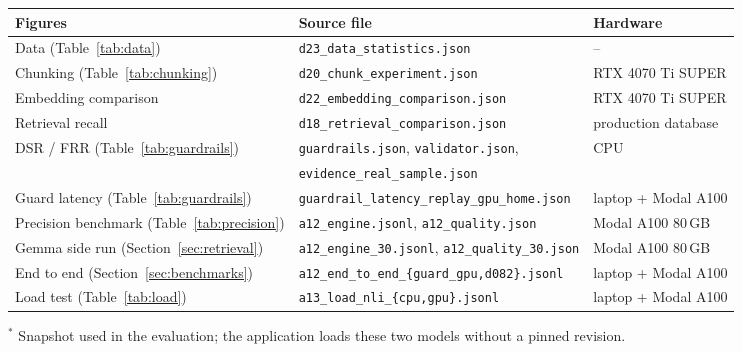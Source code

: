 \begin{table}[ht]
\medskip
\begin{tabular}{lll}
\toprule
Figures & Source file & Hardware \\
\midrule
Data (Table~\ref{tab:data}) & \texttt{d23\_data\_statistics.json} & -- \\
Chunking (Table~\ref{tab:chunking}) & \texttt{d20\_chunk\_experiment.json} & RTX 4070 Ti SUPER \\
Embedding comparison & \texttt{d22\_embedding\_comparison.json} & RTX 4070 Ti SUPER \\
Retrieval recall & \texttt{d18\_retrieval\_comparison.json} & production database \\
DSR / FRR (Table~\ref{tab:guardrails}) & \texttt{guardrails.json}, \texttt{validator.json}, & CPU \\
 & \texttt{evidence\_real\_sample.json} & \\
Guard latency (Table~\ref{tab:guardrails}) & \texttt{guardrail\_latency\_replay\_gpu\_home.json} & laptop + Modal A100 \\
Precision benchmark (Table~\ref{tab:precision}) & \texttt{a12\_engine.jsonl}, \texttt{a12\_quality.json} & Modal A100 80\,GB \\
Gemma side run (Section~\ref{sec:retrieval}) & \texttt{a12\_engine\_30.jsonl}, \texttt{a12\_quality\_30.json} & Modal A100 80\,GB \\
End to end (Section~\ref{sec:benchmarks}) & \texttt{a12\_end\_to\_end\_\{guard\_gpu,d082\}.jsonl} & laptop + Modal A100 \\
Load test (Table~\ref{tab:load}) & \texttt{a13\_load\_nli\_\{cpu,gpu\}.jsonl} & laptop + Modal A100 \\
\bottomrule
\end{tabular}

\smallskip
{\footnotesize $^{*}$ Snapshot used in the evaluation; the application loads these two models without a pinned revision.}
\end{table}
